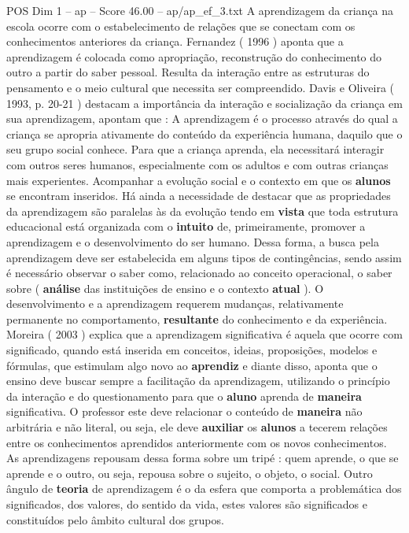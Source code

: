 \begin{textsample}{POS Dim 1 – ap – Score 46.00 – ap/ap\_ef\_3.txt}
A aprendizagem da criança na escola ocorre com o estabelecimento de relações que se conectam com os conhecimentos anteriores da criança.
Fernandez ( 1996 ) aponta que a aprendizagem é colocada como apropriação, reconstrução do conhecimento do outro a partir do saber pessoal.
Resulta da interação entre as estruturas do pensamento e o meio cultural que necessita ser compreendido.
Davis e Oliveira ( 1993, p. 20-21 ) destacam a importância da interação e socialização da criança em sua aprendizagem, apontam que : A aprendizagem é o processo através do qual a criança se apropria ativamente do conteúdo da experiência humana, daquilo que o seu grupo social conhece.
Para que a criança aprenda, ela necessitará interagir com outros seres humanos, especialmente com os adultos e com outras crianças mais experientes.
Acompanhar a evolução social e o contexto em que os \textbf{alunos} se encontram inseridos.
Há ainda a necessidade de destacar que as propriedades da aprendizagem são paralelas às da evolução tendo em \textbf{vista} que toda estrutura educacional está organizada com o \textbf{intuito} de, primeiramente, promover a aprendizagem e o desenvolvimento do ser humano.
Dessa forma, a busca pela aprendizagem deve ser estabelecida em alguns tipos de contingências, sendo assim é necessário observar o saber como, relacionado ao conceito operacional, o saber sobre ( \textbf{análise} das instituições de ensino e o contexto \textbf{atual} ).
O desenvolvimento e a aprendizagem requerem mudanças, relativamente permanente no comportamento, \textbf{resultante} do conhecimento e da experiência.
Moreira ( 2003 ) explica que a aprendizagem significativa é aquela que ocorre com significado, quando está inserida em conceitos, ideias, proposições, modelos e fórmulas, que estimulam algo novo ao \textbf{aprendiz} e diante disso, aponta que o ensino deve buscar sempre a facilitação da aprendizagem, utilizando o princípio da interação e do questionamento para que o \textbf{aluno} aprenda de \textbf{maneira} significativa.
O professor este deve relacionar o conteúdo de \textbf{maneira} não arbitrária e não literal, ou seja, ele deve \textbf{auxiliar} os \textbf{alunos} a tecerem relações entre os conhecimentos aprendidos anteriormente com os novos conhecimentos.
As aprendizagens repousam dessa forma sobre um tripé : quem aprende, o que se aprende e o outro, ou seja, repousa sobre o sujeito, o objeto, o social.
Outro ângulo de \textbf{teoria} de aprendizagem é o da esfera que comporta a problemática dos significados, dos valores, do sentido da vida, estes valores são significados e constituídos pelo âmbito cultural dos grupos.

\end{textsample}
